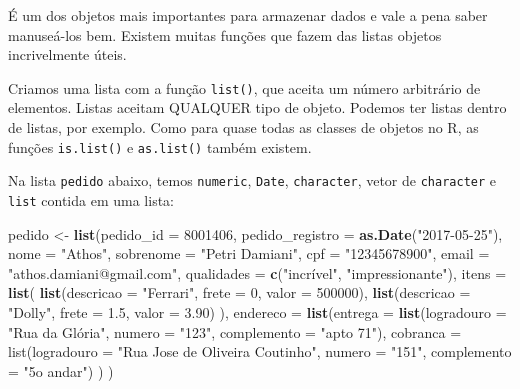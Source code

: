 \documentclass[]{book}
\newenvironment{Shaded}{\begin{snugshade}}{\end{snugshade}}
\newcommand{\DataTypeTok}[1]{\textcolor[rgb]{0.13,0.29,0.53}{#1}}
\newcommand{\DecValTok}[1]{\textcolor[rgb]{0.00,0.00,0.81}{#1}}
\newcommand{\FloatTok}[1]{\textcolor[rgb]{0.00,0.00,0.81}{#1}}
\newcommand{\KeywordTok}[1]{\textcolor[rgb]{0.13,0.29,0.53}{\textbf{#1}}}
\newcommand{\NormalTok}[1]{#1}
\newcommand{\StringTok}[1]{\textcolor[rgb]{0.31,0.60,0.02}{#1}}
\begin{document}
É um dos objetos mais importantes para armazenar dados e vale a pena saber manuseá-los bem. Existem muitas funções que fazem das listas objetos incrivelmente úteis.

Criamos uma lista com a função \texttt{list()}, que aceita um número arbitrário de elementos. Listas aceitam QUALQUER tipo de objeto. Podemos ter listas dentro de listas, por exemplo. Como para quase todas as classes de objetos no R, as funções \texttt{is.list()} e \texttt{as.list()} também existem.

Na lista \texttt{pedido} abaixo, temos \texttt{numeric}, \texttt{Date}, \texttt{character}, vetor de \texttt{character} e \texttt{list} contida em uma lista:

\begin{Shaded}
\begin{Highlighting}[]
\NormalTok{pedido <-}\StringTok{ }\KeywordTok{list}\NormalTok{(}\DataTypeTok{pedido_id =} \DecValTok{8001406}\NormalTok{,}
               \DataTypeTok{pedido_registro =} \KeywordTok{as.Date}\NormalTok{(}\StringTok{"2017-05-25"}\NormalTok{),}
               \DataTypeTok{nome =} \StringTok{"Athos"}\NormalTok{, }
               \DataTypeTok{sobrenome =} \StringTok{"Petri Damiani"}\NormalTok{, }
               \DataTypeTok{cpf =} \StringTok{"12345678900"}\NormalTok{, }
               \DataTypeTok{email =} \StringTok{"athos.damiani@gmail.com"}\NormalTok{, }
               \DataTypeTok{qualidades =} \KeywordTok{c}\NormalTok{(}\StringTok{"incrível"}\NormalTok{, }\StringTok{"impressionante"}\NormalTok{),}
               \DataTypeTok{itens =} \KeywordTok{list}\NormalTok{(}
                 \KeywordTok{list}\NormalTok{(}\DataTypeTok{descricao =} \StringTok{"Ferrari"}\NormalTok{, }
                      \DataTypeTok{frete =} \DecValTok{0}\NormalTok{, }
                      \DataTypeTok{valor =} \DecValTok{500000}\NormalTok{),}
                 \KeywordTok{list}\NormalTok{(}\DataTypeTok{descricao =} \StringTok{"Dolly"}\NormalTok{, }
                      \DataTypeTok{frete =} \FloatTok{1.5}\NormalTok{, }
                      \DataTypeTok{valor =} \FloatTok{3.90}\NormalTok{)}
\NormalTok{               ), }
               \DataTypeTok{endereco =} \KeywordTok{list}\NormalTok{(}\DataTypeTok{entrega =} \KeywordTok{list}\NormalTok{(}\DataTypeTok{logradouro =} \StringTok{"Rua da Glória", }
\StringTok{                                              numero = "}\DecValTok{123}\StringTok{",}
\StringTok{                                              complemento = "}\NormalTok{apto }\DecValTok{71}\StringTok{"),}
\StringTok{                               cobranca = list(logradouro = "}\NormalTok{Rua Jose de Oliveira Coutinho}\StringTok{",}
\StringTok{                                               numero = "}\DecValTok{151}\StringTok{",}
\StringTok{                                               complemento = "}\NormalTok{5o andar}\StringTok{")}
\StringTok{               )}
\StringTok{)}
\end{Highlighting}
\end{Shaded}
\end{document}
